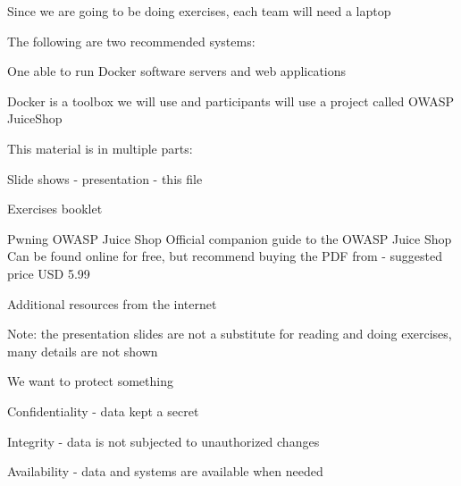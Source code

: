 \documentclass[Screen16to9,17pt]{foils}
\begin{document}


Since we are going to be doing exercises, each team will need a laptop

The following are two recommended systems:
\begin{list2}
\item One able to run Docker software servers and web applications
\end{list2}

Docker is a toolbox we will use and participants will use a project called OWASP JuiceShop




\begin{list1}
\item This material is in multiple parts:
\begin{list2}
\item Slide shows - presentation - this file
\item Exercises booklet
\item Pwning OWASP Juice Shop Official companion guide to the OWASP Juice Shop
Can be found online for free, but recommend buying the PDF from  - suggested price USD 5.99

\end{list2}
\item Additional resources from the internet
\item Note: the presentation slides are not a substitute for reading and doing exercises, many details are not shown
\end{list1}



\begin{list1}
\item We want to protect something
\item Confidentiality - data kept a secret
\item Integrity - data is not subjected to unauthorized changes
\item Availability - data and systems are available when needed
\end{list1}
\end{document}
